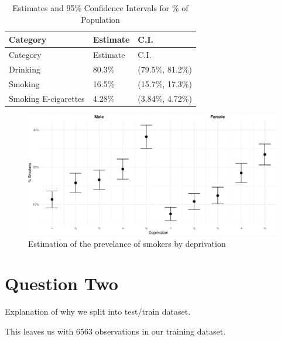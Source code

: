 \documentclass[
  11pt,
]{article}
\begin{document}
\begin{longtable}[]{@{}lll@{}}
\caption{Estimates and 95\% Confidence Intervals for \% of
Population}\tabularnewline
\toprule\noalign{}
Category & Estimate & C.I. \\
\midrule\noalign{}
\endfirsthead
\toprule\noalign{}
Category & Estimate & C.I. \\
\midrule\noalign{}
\endhead
\bottomrule\noalign{}
\endlastfoot
Drinking & 80.3\% & (79.5\%, 81.2\%) \\
Smoking & 16.5\% & (15.7\%, 17.3\%) \\
Smoking E-cigarettes & 4.28\% & (3.84\%, 4.72\%) \\
\end{longtable}

\begin{figure}
\centering
\includegraphics{Coursework_files/figure-latex/output prevelance plot-1.pdf}
\caption{Estimation of the prevelance of smokers by deprivation}
\end{figure}

\section{Question Two}\label{question-two}

Explanation of why we split into test/train dataset.

This leaves us with 6563 observations in our training dataset.
\end{document}
